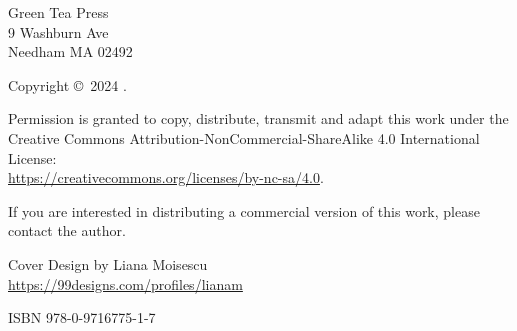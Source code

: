 \begin{flushleft}
    Green Tea Press       \\
    9 Washburn Ave \\
    Needham MA 02492
\end{flushleft}

Copyright \copyright ~2024 \theauthors.

Permission is granted to copy, distribute, transmit and adapt this work
under the Creative Commons Attribution-NonCommercial-ShareAlike 4.0
International License: \\
\url{https://creativecommons.org/licenses/by-nc-sa/4.0}.

If you are interested in distributing a commercial version of this
work, please contact the author.

Cover Design by Liana Moisescu \\
\url{https://99designs.com/profiles/lianam}

\vspace{3in}

ISBN 978-0-9716775-1-7




\cleardoublepage
\setcounter{tocdepth}{1}
\tableofcontents
